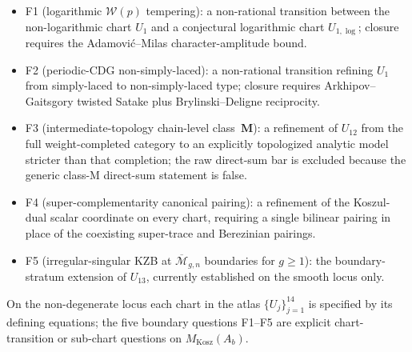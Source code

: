 \begin{itemize}
\item F1 (logarithmic $\mathcal{W}(p)$ tempering): a non-rational
 transition between the non-logarithmic chart $U_{1}$ and a
 conjectural logarithmic chart $U_{1, \log}$; closure requires
 the Adamovi\'c--Milas character-amplitude bound.
\item F2 (periodic-CDG non-simply-laced): a non-rational
 transition refining $U_{1}$ from simply-laced to non-simply-laced
 type; closure requires Arkhipov--Gaitsgory twisted Satake plus
 Brylinski--Deligne reciprocity.
\item F3 (intermediate-topology chain-level class~$\mathbf{M}$): a
 refinement of $U_{12}$ from the full weight-completed category to an
 explicitly topologized analytic model stricter than that completion;
 the raw direct-sum bar is excluded because the generic class-M
 direct-sum statement is false.
\item F4 (super-complementarity canonical pairing): a refinement
 of the Koszul-dual scalar coordinate on every chart, requiring a
 single bilinear pairing in place of the coexisting super-trace
 and Berezinian pairings.
\item F5 (irregular-singular KZB at
 $\overline{\mathcal{M}}_{g,n}$ boundaries for $g \ge 1$):
 the boundary-stratum extension of $U_{13}$, currently established
 on the smooth locus only.
\end{itemize}

\begin{remark}
\label{rem:mkosz-atlas-boundary-questions}
On the non-degenerate locus each chart in the atlas
$\{U_{j}\}_{j=1}^{14}$ is specified by its defining equations; the
five boundary questions F1--F5 are explicit chart-transition or
sub-chart questions on $M_{\mathrm{Kosz}}(A_b)$.
\end{remark}
